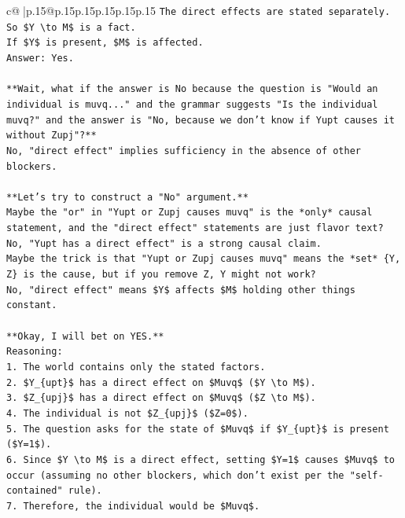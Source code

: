 \documentclass{article}
\begin{document}
{\begin{supertabular}{c@{$\;$}|p{.15\linewidth}@{}p{.15\linewidth}p{.15\linewidth}p{.15\linewidth}p{.15\linewidth}p{.15\linewidth}}
{{{\texttt{The direct effects are stated separately.} \\
\texttt{So \$Y \textbackslash{}to M\$ is a fact.} \\
\texttt{If \$Y\$ is present, \$M\$ is affected.} \\
\texttt{Answer: Yes.} \\
\\ 
\texttt{**Wait, what if the answer is No because the question is "Would an individual is muvq..." and the grammar suggests "Is the individual muvq?" and the answer is "No, because we don't know if Yupt causes it without Zupj"?**} \\
\texttt{No, "direct effect" implies sufficiency in the absence of other blockers.} \\
\\ 
\texttt{**Let's try to construct a "No" argument.**} \\
\texttt{Maybe the "or" in "Yupt or Zupj causes muvq" is the *only* causal statement, and the "direct effect" statements are just flavor text?} \\
\texttt{No, "Yupt has a direct effect" is a strong causal claim.} \\
\texttt{Maybe the trick is that "Yupt or Zupj causes muvq" means the *set* \{Y, Z\} is the cause, but if you remove Z, Y might not work?} \\
\texttt{No, "direct effect" means \$Y\$ affects \$M\$ holding other things constant.} \\
\\ 
\texttt{**Okay, I will bet on YES.**} \\
\texttt{Reasoning:} \\
\texttt{1.  The world contains only the stated factors.} \\
\texttt{2.  \$Y\_\{upt\}\$ has a direct effect on \$Muvq\$ (\$Y \textbackslash{}to M\$).} \\
\texttt{3.  \$Z\_\{upj\}\$ has a direct effect on \$Muvq\$ (\$Z \textbackslash{}to M\$).} \\
\texttt{4.  The individual is not \$Z\_\{upj\}\$ (\$Z=0\$).} \\
\texttt{5.  The question asks for the state of \$Muvq\$ if \$Y\_\{upt\}\$ is present (\$Y=1\$).} \\
\texttt{6.  Since \$Y \textbackslash{}to M\$ is a direct effect, setting \$Y=1\$ causes \$Muvq\$ to occur (assuming no other blockers, which don't exist per the "self{-}contained" rule).} \\
\texttt{7.  Therefore, the individual would be \$Muvq\$.} \\
}}}
\end{supertabular}}
\end{document}
